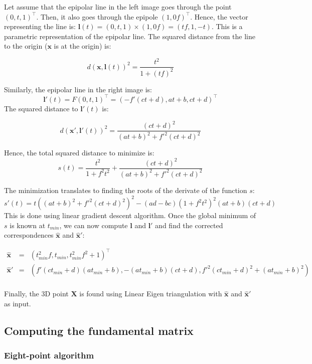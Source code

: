 \documentclass[12pt]{article}
\begin{document}
Let assume that the epipolar line in the left image goes through the point $(0, t, 1)^\top$. Then, it also goes through the epipole $(1, 0 f)^\top$. Hence, the vector representing the line is:  $\mathbf{l}(t) = (0, t, 1) \times (1, 0 f) = (tf, 1, -t)$. This is a parametric representation of the epipolar line. The squared distance from the line to the origin ($\mathbf{x}$ is at the origin) is:

\[
    d(\mathbf{x}, \mathbf{l}(t))^2 = \frac{t^2}{1+(tf)^2}
\]

Similarly, the epipolar line in the right image is:
\[
    \mathbf{l}'(t) = F(0, t, 1)^\top = (-f'(ct+d), at+b, ct+d)^\top
\]
The squared distance to $\mathbf{l}'(t)$ is:

\[
    d(\mathbf{x}', \mathbf{l}'(t))^2 = \frac{(ct+d)^2}{(at+b)^2+f'^2(ct+d)^2}
\]

Hence, the total squared distance to minimize is:
\[
    s(t) = \frac{t^2}{1+f^2t^2} + \frac{(ct+d)^2}{(at+b)^2+f'^2(ct+d)^2}
\]

The minimization translates to finding the roots of the derivate of the function $s$: 
\[
    s'(t) = t((at+b)^2 + f'^2(ct+d)^2)^2 - (ad-bc)(1+f^2t^2)^2(at+b)(ct+d)
\]
This is done using linear gradient descent algorithm. Once the global minimum of $s$ is known at $t_{min}$, we can now compute $\mathbf{l}$ and $\mathbf{l}'$ and find the corrected correspondences $\hat{\mathbf{x}}$ and $\hat{\mathbf{x}}'$:

\[
\left .
  \begin{array}{ccl}
    \hat{\mathbf{x}} & = & (t_{min}^2f, t_{min}, t_{min}^2f^2+1)^\top \\
    \hat{\mathbf{x}}' & = & (f'(ct_{min}+d)(at_{min}+b), -(at_{min}+b)(ct+d), f'^2(ct_{min}+d)^2+(at_{min}+b)^2)\\
  \end{array}
\right .
\]

Finally, the 3D point $\mathbf{X}$ is found using Linear Eigen triangulation with $\hat{\mathbf{x}}$ and $\hat{\mathbf{x}}'$ as input. 

\subsection{Computing the fundamental matrix}

\subsubsection{Eight-point algorithm}
\end{document}
